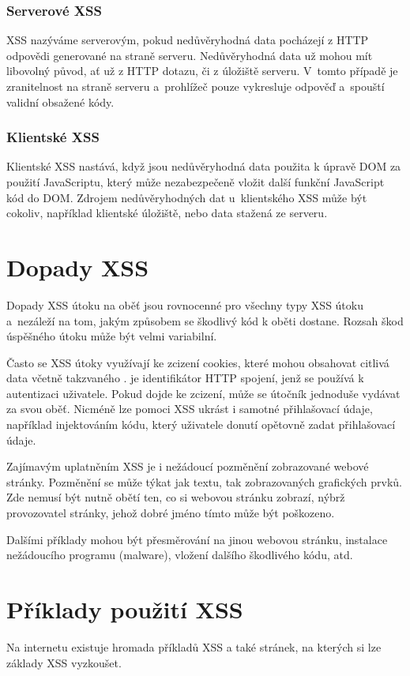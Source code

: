\documentclass[11pt, conference, a4paper]{IEEEtran}
\begin{document}
\subsubsection{Serverové XSS}
XSS nazýváme serverovým, pokud nedůvěryhodná data pocházejí z HTTP odpovědi generované na straně serveru. Nedůvěryhodná data už mohou mít libovolný původ, ať už z HTTP dotazu, či z úložiště serveru. V~tomto případě je zranitelnost na straně serveru a~prohlížeč pouze vykresluje odpověď a~spouští validní obsažené kódy.


\subsubsection{Klientské XSS}
Klientské XSS nastává, když jsou nedůvěryhodná data použita k úpravě DOM za použití JavaScriptu, který může nezabezpečeně vložit další funkční JavaScript kód do DOM. Zdrojem nedůvěryhodných dat u~klientského XSS může být cokoliv, například klientské úložiště, nebo data stažená ze serveru.~\cite{TYPES-XSS-owasp}


\section{Dopady XSS}
Dopady XSS útoku na oběť jsou rovnocenné pro všechny typy XSS útoku a~nezáleží na tom, jakým způsobem se škodlivý kód k oběti dostane. Rozsah škod úspěšného útoku může být velmi variabilní.

Často se XSS útoky využívají ke zcizení cookies, které mohou obsahovat citlivá data včetně takzvaného .  je identifikátor HTTP spojení, jenž se používá k autentizaci uživatele. Pokud dojde ke zcizení, může se útočník jednoduše vydávat za svou oběť. Nicméně lze pomoci XSS ukrást i samotné přihlašovací údaje, například injektováním kódu, který uživatele donutí opětovně zadat přihlašovací údaje. 

Zajímavým uplatněním XSS je i nežádoucí pozměnění zobrazované webové stránky. Pozměnění se může týkat jak textu, tak zobrazovaných grafických prvků. Zde nemusí být nutně obětí ten, co si webovou stránku zobrazí, nýbrž provozovatel stránky, jehož dobré jméno tímto může být poškozeno. 

Dalšími příklady mohou být přesměrování na jinou webovou stránku, instalace nežádoucího programu \mbox{(malware)}, vložení dalšího škodlivého kódu, atd.


\section{Příklady použití XSS}
Na internetu existuje hromada příkladů XSS a také stránek, na kterých si lze základy XSS vyzkoušet. 
\end{document}
